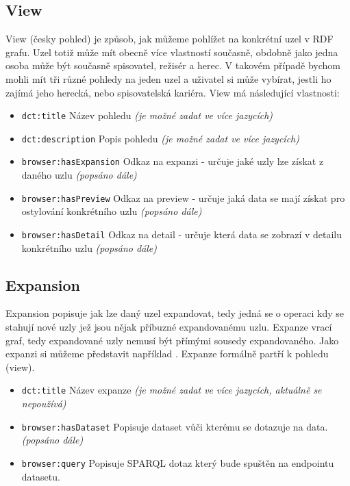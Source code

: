 \subsection{View}
View (česky pohled) je způsob, jak můžeme pohlížet na konkrétní uzel v RDF grafu. Uzel totiž může mít obecně více vlastností současně, obdobně jako jedna osoba může být současně spisovatel, režisér a herec. V takovém případě bychom mohli mít tři různé pohledy na jeden uzel a uživatel si může vybírat, jestli ho zajímá jeho herecká, nebo spisovatelská kariéra. View má následující vlastnosti:

\begin{itemize}
    \item \texttt{dct:title} Název pohledu \textit{(je možné zadat ve více jazycích)}
    \item \texttt{dct:description} Popis pohledu \textit{(je možné zadat ve více jazycích)}
    \item \texttt{browser:hasExpansion} Odkaz na expanzi - určuje jaké uzly lze získat z daného uzlu \textit{(popsáno dále)}
    \item \texttt{browser:hasPreview} Odkaz na preview - určuje jaká data se mají získat pro ostylování konkrétního uzlu \textit{(popsáno dále)}
    \item \texttt{browser:hasDetail} Odkaz na detail - určuje která data se zobrazí v detailu konkrétního uzlu \textit{(popsáno dále)}
\end{itemize}

\subsection{Expansion}
Expansion popisuje jak lze daný uzel expandovat, tedy jedná se o operaci kdy se stahují nové uzly jež jsou nějak příbuzné expandovanému uzlu. Expanze vrací graf, tedy expandované uzly nemusí být přímými sousedy expandovaného. Jako expanzi si můžeme představit například . Expanze formálně partří k pohledu (view).
\begin{itemize}
    \item \texttt{dct:title} Název expanze \textit{(je možné zadat ve více jazycích, aktuálně se nepoužívá)}
    \item \texttt{browser:hasDataset} Popisuje dataset vůči kterému se dotazuje na data. \textit{(popsáno dále)}
    \item \texttt{browser:query} Popisuje SPARQL dotaz který bude spuštěn na endpointu datasetu.
\end{itemize}

